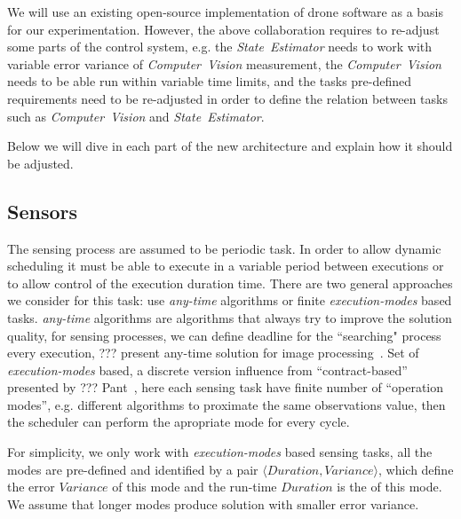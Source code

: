 \documentclass[ twoside, 12pt ]{article}
\begin{document}
{{    We will use an existing open-source implementation of drone software as a basis for our experimentation. However, the above collaboration requires to re-adjust some parts of the control system, e.g. the \textit{State~Estimator} needs to work with variable error variance of \textit{Computer~Vision} measurement,  the \textit{Computer~Vision} needs to be able run within variable time limits, and the tasks pre-defined requirements need to be re-adjusted in order to define the relation between tasks such as \textit{Computer~Vision} and \textit{State~Estimator}.
}

Below we will dive in each part of the new architecture and explain how it should be adjusted.

\subsection{Sensors}
\label{sec:sensors}
The sensing process are assumed to be periodic task. 
In order to allow dynamic scheduling it must be able to execute in a variable period between executions or to allow control of the execution duration time.
There are two general approaches we consider for this task: use \textit{any-time} algorithms or finite \textit{execution-modes} based tasks.
\textit{any-time} algorithms are algorithms that always try to improve the solution quality, for sensing processes, we can define deadline for the ``searching" process every execution, ??? present any-time solution for image processing~\cite{Shlomo}.
Set of \textit{execution-modes} based, a discrete version influence from ``contract-based'' presented by ??? Pant~\cite{UPenn-Pant}, here each sensing task have finite number of ``operation modes'', e.g. different algorithms to proximate the same observations value, then the scheduler can perform the apropriate mode for every cycle.

For simplicity, we only work with \textit{execution-modes} based sensing tasks, all the modes are pre-defined and identified by a pair $\langle Duration, Variance \rangle$,
which define the error $Variance$ of this mode and the run-time $Duration$ is the of this mode. 
We assume that longer modes produce solution with smaller error variance.

}
\end{document}
